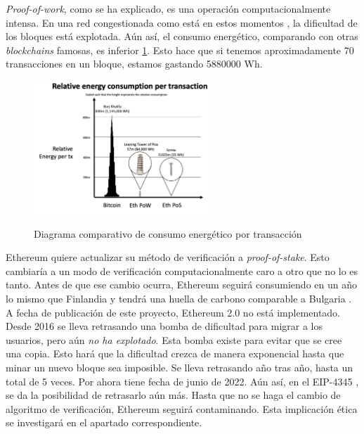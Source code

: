 \textit{Proof-of-work}, como se ha explicado, es una operación computacionalmente intensa. En una red congestionada como está en estos momentos \cite{web:gas_price}, la dificultad de los bloques está explotada. Aún así, el consumo energético, comparando con otras \textit{blockchains} famosas, es inferior \ref{fg:consumo}. Esto hace que si tenemos aproximadamente 70 transacciones en un bloque, estamos gastando 5880000 Wh.
\begin{figure}[H]
    \centering
    \includegraphics[width=0.6\textwidth]{Figures/consumo.png}
    \caption{Diagrama comparativo de consumo energético por transacción}
    \label{fg:consumo}
    \cite{web:eth_energy}
\end{figure}
Ethereum quiere actualizar su método de verificación a \textit{proof-of-stake}. Esto cambiaría a un modo de verificación computacionalmente caro a otro que no lo es tanto. Antes de que ese cambio ocurra, Ethereum seguirá consumiendo en un año lo mismo que Finlandia y tendrá una huella de carbono comparable a Bulgaria \cite{web:carbono}.
A fecha de publicación de este proyecto, Ethereum 2.0 no está implementado. Desde 2016 se lleva retrasando una bomba de dificultad para migrar a los usuarios, pero aún \textit{no ha explotado}. Esta bomba existe para evitar que se cree una copia. Esto hará que la dificultad crezca de manera exponencial hasta que minar un nuevo bloque sea imposible. Se lleva retrasando año tras año, hasta un total de 5 veces. Por ahora tiene fecha de junio de 2022. Aún así, en el EIP-4345 \cite{web:eip_bomb}, se da la posibilidad de retrasarlo aún más.
Hasta que no se haga el cambio de algoritmo de verificación, Ethereum seguirá contaminando. Esta implicación ética se investigará en el apartado correspondiente.

